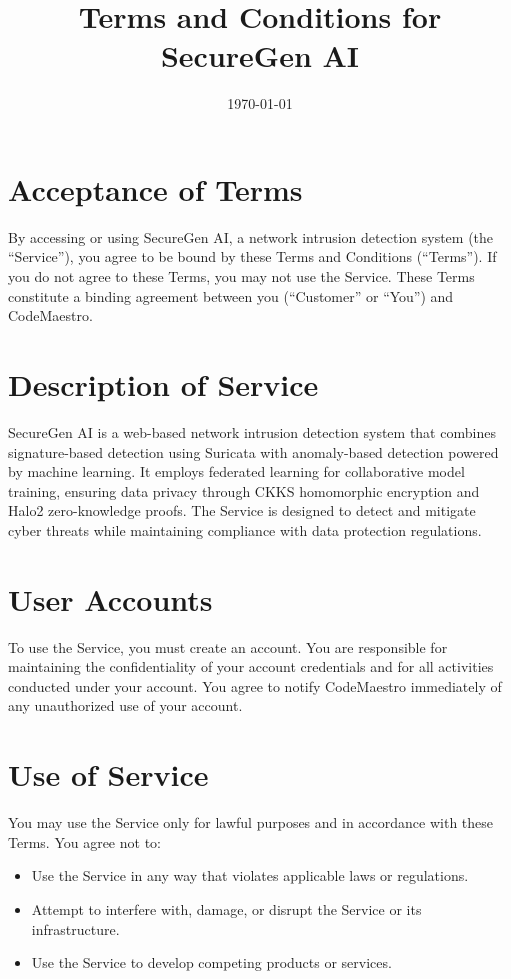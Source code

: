 \documentclass[12pt]{article}
\begin{document}
\title{Terms and Conditions for SecureGen AI}
\author{}
\date{\today}
\maketitle

\section*{Acceptance of Terms}
By accessing or using SecureGen AI, a network intrusion detection system (the ``Service''), you agree to be bound by these Terms and Conditions (``Terms''). If you do not agree to these Terms, you may not use the Service. These Terms constitute a binding agreement between you (``Customer'' or ``You'') and CodeMaestro.

\section*{Description of Service}
SecureGen AI is a web-based network intrusion detection system that combines signature-based detection using Suricata with anomaly-based detection powered by machine learning. It employs federated learning for collaborative model training, ensuring data privacy through CKKS homomorphic encryption and Halo2 zero-knowledge proofs. The Service is designed to detect and mitigate cyber threats while maintaining compliance with data protection regulations.

\section*{User Accounts}
To use the Service, you must create an account. You are responsible for maintaining the confidentiality of your account credentials and for all activities conducted under your account. You agree to notify CodeMaestro immediately of any unauthorized use of your account.

\section*{Use of Service}
You may use the Service only for lawful purposes and in accordance with these Terms. You agree not to:
\begin{itemize}
    \item Use the Service in any way that violates applicable laws or regulations.
    \item Attempt to interfere with, damage, or disrupt the Service or its infrastructure.
    \item Use the Service to develop competing products or services.
\end{itemize}
\end{document}
